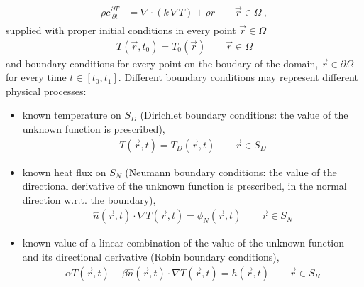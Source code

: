 \documentclass[letterpaper,10pt,english]{jupyterBook}
\begin{document}
\begin{equation*}
\begin{split}\begin{aligned}
  \rho c \frac{\partial T}{\partial t}
  & = \nabla \cdot \left( k \, \nabla T \right) + \rho r \qquad \vec{r} \in \Omega \ ,
\end{aligned}\end{split}
\end{equation*}
\sphinxAtStartPar
supplied with proper initial conditions in every point \(\vec{r} \in \Omega\)
\begin{equation*}
\begin{split}T(\vec{r}, t_0) = T_0(\vec{r}) \qquad \vec{r} \in \Omega\end{split}
\end{equation*}
\sphinxAtStartPar
and boundary conditions for every point on the boudary of the domain, \(\vec{r} \in \partial \Omega\) for every time \(t \in [t_0, t_1]\). Different boundary conditions may represent different physical processes:
\begin{itemize}
\item {} 
\sphinxAtStartPar
known temperature on \(S_D\) (Dirichlet boundary conditions: the value of the unknown function is prescribed),
\begin{equation*}
\begin{split}T(\vec{r}, t) = T_D (\vec{r}, t) \qquad \vec{r} \in S_D\end{split}
\end{equation*}
\item {} 
\sphinxAtStartPar
known heat flux on \(S_N\) (Neumann boundary conditions: the value of the directional derivative of the unknown function is prescribed, in the normal direction w.r.t. the boundary),
\begin{equation*}
\begin{split}\hat{n}(\vec{r},t) \cdot \nabla T(\vec{r}, t) = \phi_N (\vec{r}, t) \qquad \vec{r} \in S_N\end{split}
\end{equation*}
\item {} 
\sphinxAtStartPar
known value of a linear combination of the value of the unknown function and its directional derivative (Robin boundary conditions),
\begin{equation*}
\begin{split}\alpha T(\vec{r},t) + \beta \hat{n}(\vec{r},t) \cdot \nabla T(\vec{r}, t) = h(\vec{r},t) \qquad \vec{r} \in S_R\end{split}
\end{equation*}
\end{itemize}
\end{document}
